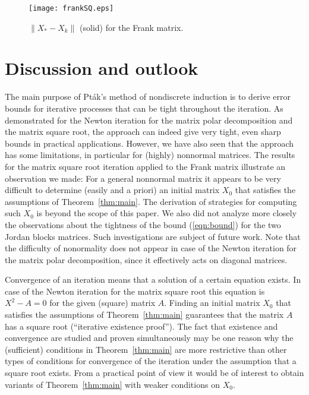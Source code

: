 \documentclass{siamltex}
\begin{document}
\begin{figure}
\begin{center}
\texttt{[image: frankSQ.eps]}
\caption{$\|X_*-X_k\|$ (solid) for the Frank matrix.}\label{fig:3}
\end{center}
\end{figure}

\section{Discussion and outlook}\label{sec:concl}

The main purpose of Pt\'ak's method of nondiscrete induction is to derive error bounds for iterative
processes that can be tight throughout the iteration. As demonstrated for the Newton
iteration for the matrix polar decomposition and the matrix square root, the approach
can indeed give very tight, even sharp bounds in practical applications. However,
we have also seen that the approach has some limitations, in particular for
(highly) nonnormal matrices. The results for the matrix square root iteration applied to the Frank matrix
illustrate an observation we made: For a general nonnormal matrix it appears to be very
difficult to determine (easily and a priori) an initial matrix $X_0$ that satisfies the assumptions of
Theorem~\ref{thm:main}. The derivation of strategies for computing such $X_0$ is beyond the scope
of this paper. We also did not analyze more closely the observations about the tightness
of the bound (\ref{eqn:bound}) for the two Jordan blocks matrices.
Such investigations are subject of future work.
Note that the difficulty of nonormality does not appear in case of the Newton
iteration for the matrix polar decomposition, since it effectively acts on diagonal matrices.

Convergence of an iteration means that a solution of a certain equation exists. In case of the
Newton iteration for the matrix square root this equation is $X^2-A=0$ for the given (square) matrix $A$.
Finding an initial matrix $X_0$ that satisfies the assumptions of Theorem~\ref{thm:main} guarantees
that the matrix $A$ has a square root (``iterative existence proof''). The fact that existence and
convergence are studied and proven simultaneously may be one reason why the (sufficient) conditions
in Theorem~\ref{thm:main} are more restrictive than other types of conditions for convergence of the
iteration under the assumption that a square root exists. From a practical point of view it would be
of interest to obtain variants of Theorem~\ref{thm:main} with weaker conditions on $X_0$.
\end{document}
